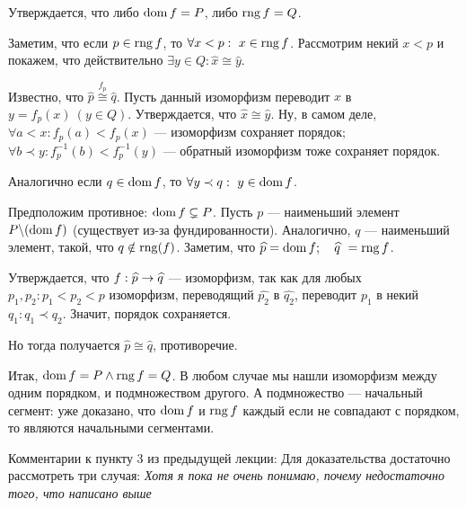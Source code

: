 \documentclass[a4paper]{report}
\begin{document}
{{{            \item Утверждается, что либо $\operatorname{dom} f = P$, либо $\operatorname{rng} f = Q$.

            \item Заметим, что если $p \in \operatorname{rng} f$, то $\forall x < p : ~x \in \operatorname{rng} f$. Рассмотрим некий $x < p$ и покажем, что действительно $\exists y \in Q : \hat{x} \cong \hat{y}$.

            Известно, что $\hat{p} \overset{f_p}{\cong} \hat{q}$. Пусть данный изоморфизм переводит $x$ в $y = f_p(x)~ (y \in Q)$. Утверждается, что $\hat{x} \cong \hat{y}$. Ну, в самом деле, $\forall a < x: f_p(a) < f_p(x)$ --- изоморфизм сохраняет порядок; $\forall b \prec y : f_p^{-1}(b) < f_p^{-1}(y)$ --- обратный изоморфизм тоже сохраняет порядок.

            \item Аналогично если $q \in \operatorname{dom} f$, то $\forall y \prec q : ~ y \in \operatorname{dom} f$.

            \item Предположим противное: $\operatorname{dom} f \subsetneq P$. Пусть $p$ --- наименьший элемент $P\backslash(\operatorname{dom} f)$ (существует из-за фундированности). Аналогично, $q$ --- наименьший элемент, такой, что $q \notin \operatorname{rng}(f)$. Заметим, что $\widehat{p} = \operatorname{dom} f; \quad \widehat{q}~ = \operatorname{rng} f$.

            Утверждается, что $f : \widehat{p} \rightarrow \widehat{q}$ --- изоморфизм, так как для любых $p_1, p_2: {p_1 < p_2 < p}$ изоморфизм, переводящий $\hat{p_2}$ в $\hat{q_2}$, переводит $p_1$ в некий $q_1:q_1 \prec q_2$. Значит, порядок сохраняется.

            Но тогда получается $\hat{p} \cong \hat{q}$, противоречие.

            \item Итак, $\operatorname{dom} f = P \land \operatorname{rng} f = Q$. В любом случае мы нашли изоморфизм между одним порядком, и подмножеством другого. А подмножество --- начальный сегмент: уже доказано, что $\operatorname{dom} f$ и $\operatorname{rng} f$ каждый если не совпадают с порядком, то являются начальными сегментами.
            }
        }
    }
    Комментарии к пункту 3 из предыдущей лекции:
    Для доказательства достаточно рассмотреть три случая: \textit{Хотя я пока не очень понимаю, почему недостаточно того, что написано выше}
\end{document}
